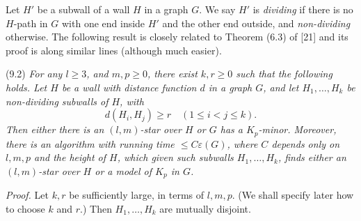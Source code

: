 Let $H'$ be a subwall of a wall $H$ in a graph $G$. We say $H'$ is \textit{dividing} if there is no $H$-path in $G$ with one end inside $H'$ and the other end outside, and \textit{non-dividing} otherwise. The following result is closely related to Theorem (6.3) of [21] and its proof is along similar lines (although much easier).

\stmt
(9.2) \textit{For any $l \ge 3$, and $m, p \ge 0$, there exist $k, r \ge 0$ such that the following holds. Let $H$ be a wall with distance function $d$ in a graph $G$, and let $H_1, \dots, H_k$ be non-dividing subwalls of $H$, with}
\begin{equation*}
d(H_i, H_j) \ge r \quad (1 \le i < j \le k).
\end{equation*}
\textit{Then either there is an $(l, m)$-star over $H$ or $G$ has a $K_p$-minor. Moreover, there is an algorithm with running time $\le C\varepsilon(G)$, where $C$ depends only on $l, m, p$ and the height of $H$, which given such subwalls $H_1, \dots, H_k$, finds either an $(l, m)$-star over $H$ or a model of $K_p$ in $G$.}

\textit{Proof.} Let $k, r$ be sufficiently large, in terms of $l, m, p$. (We shall specify later how to choose $k$ and $r$.) Then $H_1, \dots, H_k$ are mutually disjoint.

